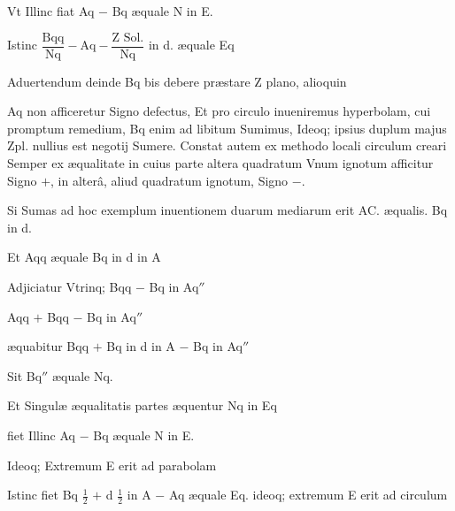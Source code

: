 \documentclass[11pt,a4paper]{article}
\begin{document}
Vt Illinc fiat Aq $-$ Bq æquale N in E.

Istinc
$\dfrac{\text{Bqq}}{\text{Nq}} - \text{Aq} - \dfrac{\text{Z Sol.}}{\text{Nq}}$ in d. æquale Eq

Aduertendum deinde Bq bis debere præstare Z plano, alioquin


Aq non afficeretur Signo defectus, Et pro circulo inueniremus hyperbolam, cui promptum remedium, Bq enim ad libitum Sumimus, Ideoq; ipsius duplum majus Zpl. nullius est negotij Sumere. Constat autem ex methodo locali circulum creari Semper ex æqualitate in cuius parte altera quadratum Vnum ignotum afficitur Signo  $+$, in alterâ, aliud quadratum ignotum, Signo  $-$.

Si Sumas ad hoc exemplum inuentionem duarum mediarum erit AC. æqualis. Bq in d.

Et Aqq æquale Bq in d in A

Adjiciatur Vtrinq; Bqq $-$ Bq in Aq$''$

Aqq $+$ Bqq $-$ Bq in Aq$''$

æquabitur Bqq $+$ Bq in d in A $-$ Bq in Aq$''$

Sit Bq$''$ æquale Nq.

Et Singulæ æqualitatis partes æquentur Nq in Eq

fiet Illinc Aq $-$ Bq æquale N in E.

Ideoq; Extremum E erit ad parabolam

Istinc fiet Bq $\frac{1}{2}$ $+$ d $\frac{1}{2}$ in A $-$ Aq æquale Eq. ideoq; extremum E erit ad circulum
\end{document}
